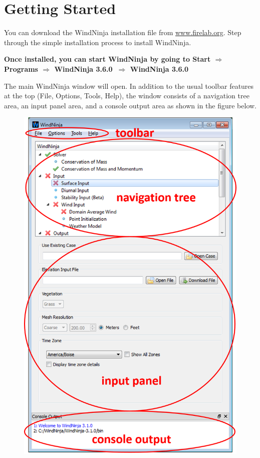 \documentclass[12pt]{article}
\newcommand\vn{3.6.0}
\begin{document}
\section{Getting Started}

You can download the WindNinja installation file from \url{www.firelab.org}.  Step through the simple installation process to install WindNinja.

\textbf{\color{red}Once installed, you can start WindNinja by going to Start $\Rightarrow$ Programs $\Rightarrow$ WindNinja \vn\ $\Rightarrow$ WindNinja \vn\ }

The main WindNinja window will open.  In addition to the usual toolbar features at the top (File, Options, Tools, Help), the window consists of a navigation tree area, an input panel area, and a console output area as shown in the figure below.

\begin{figure}[H]
	\centering
	\label{}
	\includegraphics[scale=0.75]{layout_1.png}
\end{figure}
\end{document}
